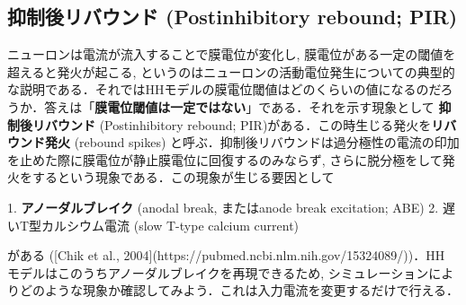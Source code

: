 \subsection{抑制後リバウンド (Postinhibitory rebound; PIR)}
ニューロンは電流が流入することで膜電位が変化し, 膜電位がある一定の閾値を超えると発火が起こる, というのはニューロンの活動電位発生についての典型的な説明である．それではHHモデルの膜電位閾値はどのくらいの値になるのだろうか．答えは「\textbf{膜電位閾値は一定ではない}」である．それを示す現象として \textbf{抑制後リバウンド} (Postinhibitory rebound; PIR)がある．この時生じる発火を\textbf{リバウンド発火} (rebound spikes) 
と呼ぶ．抑制後リバウンドは過分極性の電流の印加を止めた際に膜電位が静止膜電位に回復するのみならず, さらに脱分極をして発火をするという現象である．この現象が生じる要因として

1. \textbf{アノーダルブレイク} (anodal break, またはanode break excitation; ABE)
2. 遅いT型カルシウム電流 (slow T-type calcium current)

がある ([Chik et al., 2004](https://pubmed.ncbi.nlm.nih.gov/15324089/))．HH モデルはこのうちアノーダルブレイクを再現できるため, シミュレーションによりどのような現象か確認してみよう．これは入力電流を変更するだけで行える．

